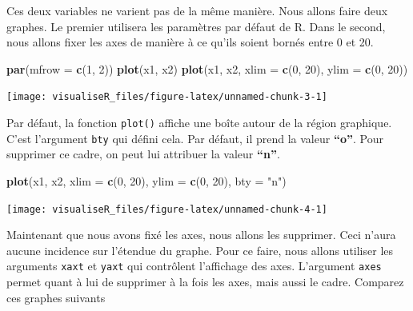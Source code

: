 \documentclass[]{article}
\newenvironment{Shaded}{\begin{snugshade}}{\end{snugshade}}
\newcommand{\DataTypeTok}[1]{\textcolor[rgb]{0.13,0.29,0.53}{#1}}
\newcommand{\DecValTok}[1]{\textcolor[rgb]{0.00,0.00,0.81}{#1}}
\newcommand{\KeywordTok}[1]{\textcolor[rgb]{0.13,0.29,0.53}{\textbf{#1}}}
\newcommand{\NormalTok}[1]{#1}
\newcommand{\StringTok}[1]{\textcolor[rgb]{0.31,0.60,0.02}{#1}}
\begin{document}
Ces deux variables ne varient pas de la même manière. Nous allons faire deux graphes. Le premier utilisera les paramètres par défaut de R. Dans le second, nous allons fixer les axes de manière à ce qu'ils soient bornés entre 0 et 20.

\begin{Shaded}
\begin{Highlighting}[]
\KeywordTok{par}\NormalTok{(}\DataTypeTok{mfrow =} \KeywordTok{c}\NormalTok{(}\DecValTok{1}\NormalTok{, }\DecValTok{2}\NormalTok{))}
\KeywordTok{plot}\NormalTok{(x1, x2)}
\KeywordTok{plot}\NormalTok{(x1, x2, }\DataTypeTok{xlim =} \KeywordTok{c}\NormalTok{(}\DecValTok{0}\NormalTok{, }\DecValTok{20}\NormalTok{), }\DataTypeTok{ylim =} \KeywordTok{c}\NormalTok{(}\DecValTok{0}\NormalTok{, }\DecValTok{20}\NormalTok{))}
\end{Highlighting}
\end{Shaded}

\begin{center}\texttt{[image: visualiseR\_files/figure-latex/unnamed-chunk-3-1]} \end{center}

Par défaut, la fonction \texttt{plot()} affiche une boîte autour de la région graphique. C'est l'argument \texttt{bty} qui défini cela. Par défaut, il prend la valeur \textbf{``o''}. Pour supprimer ce cadre, on peut lui attribuer la valeur \textbf{``n''}.

\begin{Shaded}
\begin{Highlighting}[]
\KeywordTok{plot}\NormalTok{(x1, x2, }\DataTypeTok{xlim =} \KeywordTok{c}\NormalTok{(}\DecValTok{0}\NormalTok{, }\DecValTok{20}\NormalTok{), }\DataTypeTok{ylim =} \KeywordTok{c}\NormalTok{(}\DecValTok{0}\NormalTok{, }\DecValTok{20}\NormalTok{), }\DataTypeTok{bty =} \StringTok{"n"}\NormalTok{)}
\end{Highlighting}
\end{Shaded}

\begin{center}\texttt{[image: visualiseR\_files/figure-latex/unnamed-chunk-4-1]} \end{center}

Maintenant que nous avons fixé les axes, nous allons les supprimer. Ceci n'aura aucune incidence sur l'étendue du graphe. Pour ce faire, nous allons utiliser les arguments \texttt{xaxt} et \texttt{yaxt} qui contrôlent l'affichage des axes. L'argument \texttt{axes} permet quant à lui de supprimer à la fois les axes, mais aussi le cadre. Comparez ces graphes suivants
\end{document}
